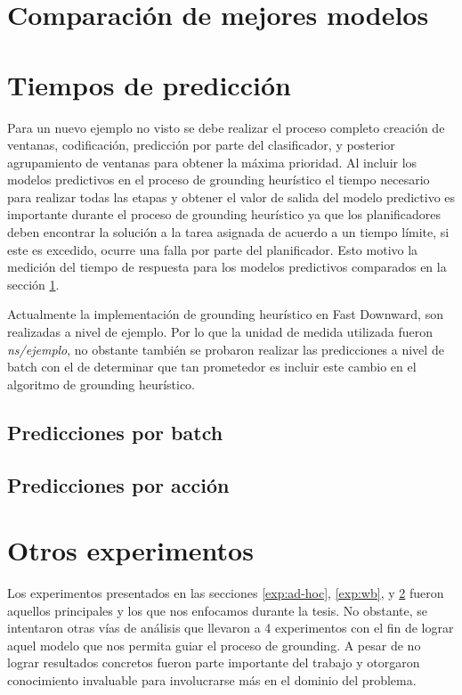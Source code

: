 \section{Comparación de mejores modelos}
\label{results:comparison}

\section{Tiempos de predicción}
\label{exp:time}

Para un nuevo ejemplo no visto se debe realizar el proceso completo creación de ventanas, codificación, predicción por parte del clasificador, y posterior agrupamiento de ventanas para obtener la máxima prioridad. Al incluir los modelos predictivos en el proceso de grounding heurístico el tiempo necesario para realizar todas las etapas y obtener el valor de salida del modelo predictivo es importante durante el proceso de grounding heurístico ya que los planificadores deben encontrar la solución a la tarea asignada de acuerdo a un tiempo límite, si este es excedido, ocurre una falla por parte del planificador. Esto motivo la medición del tiempo de respuesta para los modelos predictivos comparados en la sección \ref{results:comparison}.

Actualmente la implementación de grounding heurístico en Fast Downward, son realizadas a nivel de ejemplo. Por lo que la unidad de medida utilizada fueron \emph{ns/ejemplo}, no obstante también se probaron realizar las predicciones a nivel de batch con el de determinar que tan prometedor es incluir este cambio en el algoritmo de grounding heurístico.

\subsection{Predicciones por batch}

\subsection{Predicciones por acción}

\section{Otros experimentos}

Los experimentos presentados en las secciones \ref{exp:ad-hoc}, \ref{exp:wb}, y \ref{exp:time} fueron aquellos principales y los que nos enfocamos durante la tesis. No obstante, se intentaron otras vías de análisis que llevaron a 4 experimentos con el fin de lograr aquel modelo que nos permita guiar el proceso de grounding. A pesar de no lograr resultados concretos fueron parte importante del trabajo y otorgaron conocimiento invaluable para involucrarse más en el dominio del problema.

